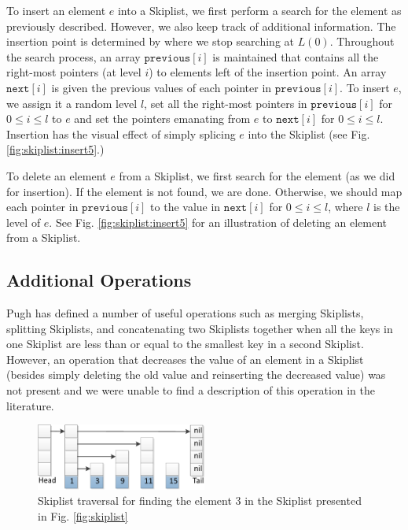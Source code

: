\documentclass{acm_proc_article-sp}
\begin{document}
To insert an element $e$ into a Skiplist, we first perform a search for the element
as previously described. However, we also keep track of additional information.
The insertion point is determined by where we stop searching at $L(0)$. Throughout the
search process, an array
$\texttt{previous}[i]$ is maintained that contains all the right-most pointers (at level $i$)
to elements left of the insertion point. An array $\texttt{next}[i]$ is given the previous values
of each pointer in $\texttt{previous}[i]$. To insert $e$, we assign it a random level $l$, set 
all the right-most pointers in $\texttt{previous}[i]$ for $0 \leq i \leq l$ to $e$ and set
the pointers emanating from $e$ to $\texttt{next}[i]$ for $0 \leq i \leq l$. Insertion has
the visual effect of simply splicing $e$ into the Skiplist (see Fig. \ref{fig:skiplist:insert5}.)

To delete an element $e$ from a Skiplist, we first search for the element (as we did for insertion).
If the element is not found, we are done. Otherwise, we should map each pointer in $\texttt{previous}[i]$
to the value in $\texttt{next}[i]$ for $0 \leq i \leq l$, where $l$ is the level of $e$. See Fig. \ref{fig:skiplist:insert5} for an illustration of deleting an element from a Skiplist.

\subsection{Additional Operations}
Pugh has defined \cite{pugh90a} a number of useful
operations such as merging Skiplists, splitting Skiplists, and
concatenating two Skiplists together when all the keys in one Skiplist
are less than or equal to the smallest key in a second Skiplist. However,
an operation that decreases the value of an element in a Skiplist (besides
simply deleting the old value and reinserting the decreased value) was not present and
we were unable to find a description of this operation in the literature.

\begin{figure}[H]
  \includegraphics[width=0.5\textwidth]{img/skiplistSearch-crop.pdf}
  \caption{Skiplist traversal for finding the element 3 in the Skiplist presented in Fig. \ref{fig:skiplist}}
  \label{fig:skiplist:search3}
\end{figure}
\end{document}
